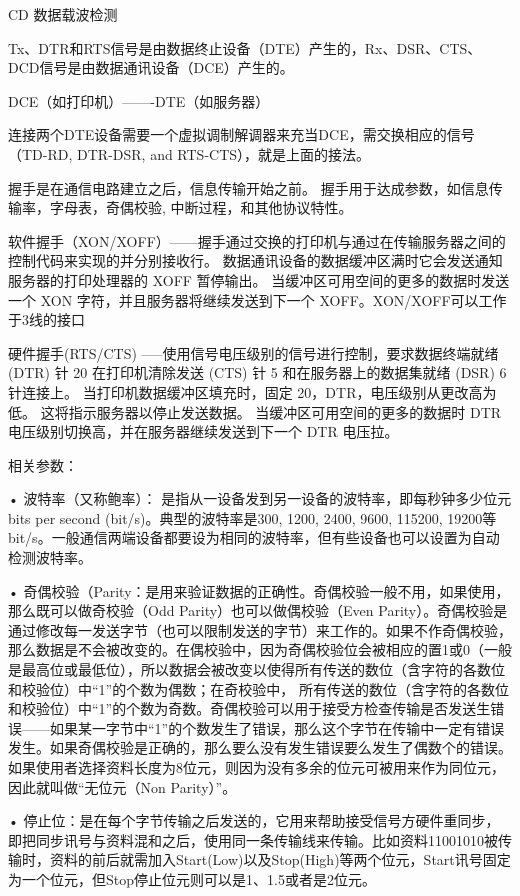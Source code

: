CD 数据载波检测

Tx、DTR和RTS信号是由数据终止设备（DTE）产生的，Rx、DSR、CTS、DCD信号是由数据通讯设备（DCE）产生的。

DCE（如打印机）-------DTE（如服务器）

连接两个DTE设备需要一个虚拟调制解调器来充当DCE，需交换相应的信号（TD-RD, DTR-DSR, and RTS-CTS），就是上面的接法。

握手是在通信电路建立之后，信息传输开始之前。 握手用于达成参数，如信息传输率，字母表，奇偶校验, 中断过程，和其他协议特性。

软件握手（XON/XOFF）------握手通过交换的打印机与通过在传输服务器之间的控制代码来实现的并分别接收行。 数据通讯设备的数据缓冲区满时它会发送通知服务器的打印处理器的 XOFF 暂停输出。 当缓冲区可用空间的更多的数据时发送一个 XON 字符，并且服务器将继续发送到下一个 XOFF。XON/XOFF可以工作于3线的接口

硬件握手(RTS/CTS) -----使用信号电压级别的信号进行控制，要求数据终端就绪 (DTR) 针 20 在打印机清除发送 (CTS) 针 5 和在服务器上的数据集就绪 (DSR) 6 针连接上。 当打印机数据缓冲区填充时，固定 20，DTR，电压级别从更改高为低。 这将指示服务器以停止发送数据。 当缓冲区可用空间的更多的数据时 DTR 电压级别切换高，并在服务器继续发送到下一个 DTR 电压拉。

相关参数：

•	波特率（又称鲍率）： 是指从一设备发到另一设备的波特率，即每秒钟多少位元bits per second (bit/s)。典型的波特率是300, 1200, 2400, 9600, 115200, 19200等bit/s。一般通信两端设备都要设为相同的波特率，但有些设备也可以设置为自动检测波特率。

•	奇偶校验（Parity：是用来验证数据的正确性。奇偶校验一般不用，如果使用，那么既可以做奇校验（Odd Parity）也可以做偶校验（Even Parity）。奇偶校验是通过修改每一发送字节（也可以限制发送的字节）来工作的。如果不作奇偶校验，那么数据是不会被改变的。在偶校验中，因为奇偶校验位会被相应的置1或0（一般是最高位或最低位），所以数据会被改变以使得所有传送的数位（含字符的各数位和校验位）中“1”的个数为偶数；在奇校验中， 所有传送的数位（含字符的各数位和校验位）中“1”的个数为奇数。奇偶校验可以用于接受方检查传输是否发送生错误——如果某一字节中“1”的个数发生了错误，那么这个字节在传输中一定有错误发生。如果奇偶校验是正确的，那么要么没有发生错误要么发生了偶数个的错误。如果使用者选择资料长度为8位元，则因为没有多余的位元可被用来作为同位元，因此就叫做“无位元（Non Parity）”。

•	停止位：是在每个字节传输之后发送的，它用来帮助接受信号方硬件重同步，即把同步讯号与资料混和之后，使用同一条传输线来传输。比如资料11001010被传输时，资料的前后就需加入Start(Low)以及Stop(High)等两个位元，Start讯号固定为一个位元，但Stop停止位元则可以是1、1.5或者是2位元。

